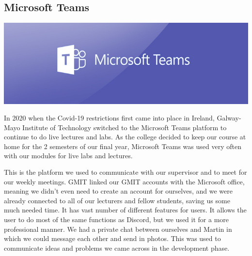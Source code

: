 \subsection{Microsoft Teams}
\includegraphics[scale=0.5]{img/teams-728.jpg}\par
In 2020 when the Covid-19 restrictions first came into place in Ireland, Galway-Mayo Institute of Technology switched to the Microsoft Teams platform to continue to do live lectures and labs. As the college decided to keep our course at home for the 2 semesters of our final year, Microsoft Teams was used very often with our modules for live labs and lectures. \par
This is the platform we used to communicate with our supervisor and to meet for our weekly meetings. GMIT linked our GMIT accounts with the Microsoft office, meaning we didn't even need to create an account for ourselves, and we were already connected to all of our lecturers and fellow students, saving us some much needed time. It has vast number of different features for users. It allows the user to do most of the same functions as Discord, but we used it for a more professional manner. We had a private chat between ourselves and Martin in which we could message each other and send in photos. This was used to communicate ideas and problems we came across in the development phase. \par

